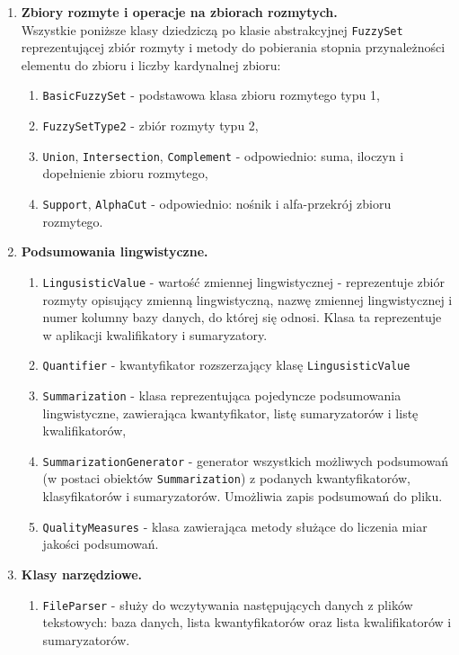 \documentclass{classrep}
\begin{document}
\begin{enumerate}
\item \textbf{Zbiory rozmyte i operacje na zbiorach rozmytych.}\\
Wszystkie poniższe klasy dziedziczą po klasie abstrakcyjnej \verb|FuzzySet| reprezentującej zbiór rozmyty i metody do pobierania stopnia przynależności elementu do zbioru i liczby kardynalnej zbioru:
\begin{enumerate}
\item \verb|BasicFuzzySet| - podstawowa klasa zbioru rozmytego typu 1,
\item \verb|FuzzySetType2| - zbiór rozmyty typu 2,
\item \verb|Union|, \verb|Intersection|, \verb|Complement| - odpowiednio: suma, iloczyn i dopełnienie zbioru rozmytego,
\item \verb|Support|, \verb|AlphaCut| - odpowiednio: nośnik i alfa-przekrój zbioru rozmytego.
\end{enumerate}
\item \textbf{Podsumowania lingwistyczne.}
\begin{enumerate}
\item \verb|LingusisticValue| - wartość zmiennej lingwistycznej - reprezentuje zbiór rozmyty opisujący zmienną lingwistyczną, nazwę zmiennej lingwistycznej i numer kolumny bazy danych, do której się odnosi. Klasa ta reprezentuje w aplikacji kwalifikatory i sumaryzatory.
\item \verb|Quantifier| - kwantyfikator rozszerzający klasę \verb|LingusisticValue|
\item \verb|Summarization| - klasa reprezentująca pojedyncze podsumowania lingwistyczne, zawierająca kwantyfikator, listę sumaryzatorów i listę kwalifikatorów,
\item \verb|SummarizationGenerator| - generator wszystkich możliwych podsumowań (w postaci obiektów \verb|Summarization|) z podanych kwantyfikatorów, klasyfikatorów i sumaryzatorów. Umożliwia zapis podsumowań do pliku.
\item \verb|QualityMeasures| - klasa zawierająca metody służące do liczenia miar jakości podsumowań.
\end{enumerate}

\item \textbf{Klasy narzędziowe.}
\begin{enumerate}
\item \verb|FileParser| - służy do wczytywania następujących danych z plików tekstowych: baza danych, lista kwantyfikatorów oraz lista kwalifikatorów i sumaryzatorów. 
\end{enumerate}

\end{enumerate}
\end{document}
